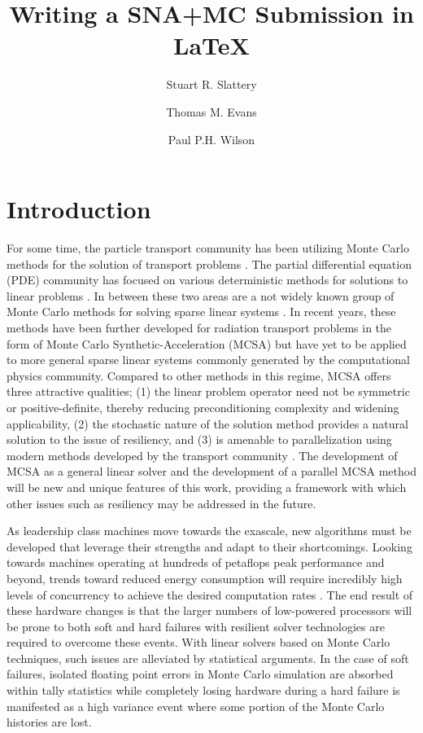 \documentclass{snamc2013}
\title{Writing a SNA+MC Submission in \LaTeX}
\author[1]{Stuart R. Slattery}
\author[2]{Thomas M. Evans}
\author[1]{Paul P.H. Wilson}
\affil[1]{University of Wisconsin - Madison, Engineering Physics
  Department, 1500 Engineering Dr., Madison, WI 53716}
\affil[2]{Oak Ridge National Laboratory, Reactor and Nuclear Systems
  Division, 1 Bethel Valley Rd., Oak Ridge, TN 37831}
\begin{document}
\section{Introduction}

For some time, the particle transport community has been utilizing
Monte Carlo methods for the solution of transport problems
\cite{lewis_computational_1993}. The partial differential equation
(PDE) community has focused on various deterministic methods for
solutions to linear problems \cite{saad_iterative_2003}. In between
these two areas are a not widely known group of Monte Carlo methods
for solving sparse linear systems \cite{forsythe_matrix_1950,
  hammersley_monte_1964, halton_sequential_1962,
  halton_sequential_1994}. In recent years, these methods have been
further developed for radiation transport problems in the form of
Monte Carlo Synthetic-Acceleration (MCSA) \cite{evans_monte_2009,
  evans_monte_2012} but have yet to be applied to more general sparse
linear systems commonly generated by the computational physics
community. Compared to other methods in this regime, MCSA offers three
attractive qualities; (1) the linear problem operator need not be
symmetric or positive-definite, thereby reducing preconditioning
complexity and widening applicability, (2) the stochastic nature of
the solution method provides a natural solution to the issue of
resiliency, and (3) is amenable to parallelization using modern
methods developed by the transport community
\cite{wagner_hybrid_2010}. The development of MCSA as a general linear
solver and the development of a parallel MCSA method will be new and
unique features of this work, providing a framework with which other
issues such as resiliency may be addressed in the future.

As leadership class machines move towards the exascale, new algorithms
must be developed that leverage their strengths and adapt to their
shortcomings. Looking towards machines operating at hundreds of
petaflops peak performance and beyond, trends toward reduced energy
consumption will require incredibly high levels of concurrency to
achieve the desired computation rates \cite{kogge_using_2011}. The end
result of these hardware changes is that the larger numbers of
low-powered processors will be prone to both soft and hard failures
with resilient solver technologies are required to overcome these
events. With linear solvers based on Monte Carlo techniques, such
issues are alleviated by statistical arguments. In the case of soft
failures, isolated floating point errors in Monte Carlo simulation are
absorbed within tally statistics while completely losing hardware
during a hard failure is manifested as a high variance event where
some portion of the Monte Carlo histories are lost.
\end{document}
